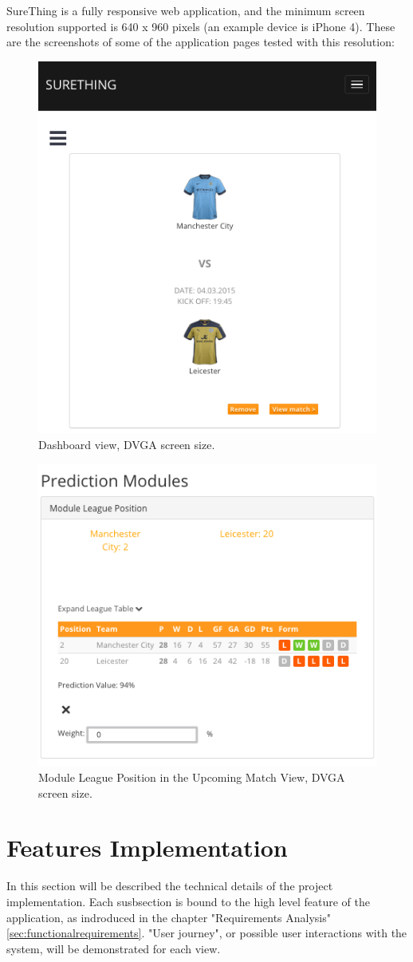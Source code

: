 SureThing is a fully responsive web application, and the minimum screen resolution supported is 640 x 960 pixels (an example device is iPhone 4). These are the screenshots of some of the application pages tested with this resolution:

\begin{figure}[H]
	\begin{center}
		\includegraphics[width=.50\columnwidth]{impl/images/responsiveDashboard}
		\caption{Dashboard view, DVGA screen size.} \label{fig:using:responsivedashboard}
	\end{center}
\end{figure}

\begin{figure}[H]
	\begin{center}
		\includegraphics[width=.50\columnwidth]{impl/images/responsiveModuleLeaguePosition}
		\caption{Module League Position in the Upcoming Match View, DVGA screen size.} \label{fig:using:responsivemoduleleagueposition}
	\end{center}
\end{figure}

\section{Features Implementation}
In this section will be described the technical details of the project implementation. Each susbsection is bound to the high level feature of the application, as indroduced in the chapter "Requirements Analysis" \ref{sec:functionalrequirements}. "User journey", or possible user interactions with the system, will be demonstrated for each view.


